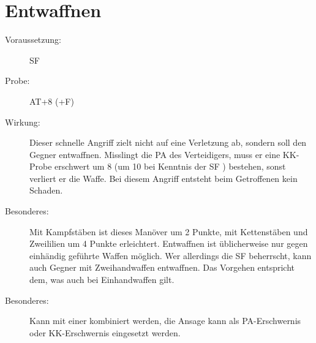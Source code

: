 \section{Entwaffnen}
\label{aktion.entwaffnen}
\begin{description}
    \item[Voraussetzung:]
        SF 
    \item[Probe:]
        AT+8 (+F)
    \item[Wirkung:]
        Dieser schnelle Angriff zielt nicht auf eine Verletzung ab, sondern soll den Gegner entwaffnen.
        Misslingt die PA des Verteidigers, muss er eine KK-Probe erschwert um 8 (um 10 bei Kenntnis der SF ) bestehen, sonst verliert er die Waffe.
        Bei diesem Angriff entsteht beim Getroffenen kein Schaden.
    \item[Besonderes:]
        Mit Kampfstäben ist dieses Manöver um 2 Punkte, mit Kettenstäben und Zweililien um 4 Punkte erleichtert.
        Entwaffnen ist üblicherweise nur gegen einhändig geführte Waffen möglich.
        Wer allerdings die SF  beherrscht, kann auch Gegner mit Zweihandwaffen entwaffnen.
        Das Vorgehen entspricht dem, was auch bei Einhandwaffen gilt.
    \item[Besonderes:]
        Kann mit einer  kombiniert werden, die Ansage kann als PA-Erschwernis oder KK-Erschwernis eingesetzt werden.
\end{description}
